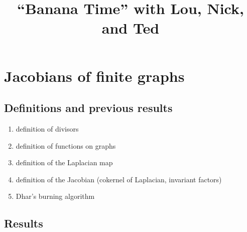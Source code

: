 \documentclass{amsart}
\title{``Banana Time'' with Lou, Nick, and Ted}
\begin{document}
\maketitle

\section{Jacobians of finite graphs}

\subsection{Definitions and previous results}

\begin{enumerate}
\item definition of divisors
\item definition of functions on graphs
\item definition of the Laplacian map
\item definition of the Jacobian (cokernel of Laplacian,
invariant factors)
\item Dhar's burning algorithm
\end{enumerate}

\subsection{Results}
\end{document}
